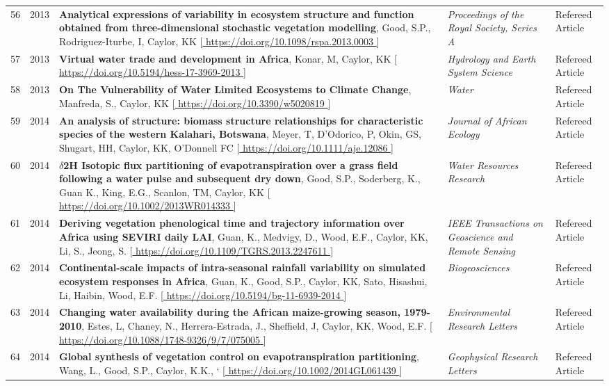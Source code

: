 \begin{supertabular}{lcp{8.25cm}p{4.75cm}p{1.75cm}}
56 & 2013 & {\bf Analytical expressions of variability in ecosystem structure and function obtained from three-dimensional stochastic vegetation modelling}, Good, S.P., Rodriguez-Iturbe, I, Caylor, KK [\url{ https://doi.org/10.1098/rspa.2013.0003 }] & \emph{ Proceedings of the Royal Society, Series A } & Refereed Article\\
57 & 2013 & {\bf Virtual water trade and development in Africa}, Konar, M, Caylor, KK [\url{ https://doi.org/10.5194/hess-17-3969-2013 }] & \emph{ Hydrology and Earth System Science } & Refereed Article\\
58 & 2013 & {\bf On The Vulnerability of Water Limited Ecosystems to Climate Change}, Manfreda, S., Caylor, KK [\url{ https://doi.org/10.3390/w5020819 }] & \emph{ Water } & Refereed Article\\
59 & 2014 & {\bf An analysis of structure: biomass structure relationships for characteristic species of the western Kalahari, Botswana}, Meyer, T, D'Odorico, P, Okin, GS, Shugart, HH, Caylor, KK, O'Donnell FC [\url{ https://doi.org/10.1111/aje.12086 }] & \emph{ Journal of African Ecology } & Refereed Article\\
60 & 2014 & {\bf $\delta$2H Isotopic flux partitioning of evapotranspiration over a grass field following a water pulse and subsequent dry down}, Good, S.P., Soderberg, K., Guan K., King, E.G., Scanlon, TM, Caylor, KK [\url{ https://doi.org/10.1002/2013WR014333 }] & \emph{ Water Resources Research } & Refereed Article\\
61 & 2014 & {\bf Deriving vegetation phenological time and trajectory information over Africa using SEVIRI daily LAI}, Guan, K., Medvigy, D., Wood, E.F., Caylor, KK, Li, S., Jeong, S. [\url{ https://doi.org/10.1109/TGRS.2013.2247611 }] & \emph{ IEEE Transactions on Geoscience and Remote Sensing } & Refereed Article\\
62 & 2014 & {\bf Continental-scale impacts of intra-seasonal rainfall variability on simulated ecosystem responses in Africa}, Guan, K., Good, S.P., Caylor, KK, Sato, Hisashui, Li, Haibin, Wood, E.F. [\url{ https://doi.org/10.5194/bg-11-6939-2014 }] & \emph{ Biogeosciences } & Refereed Article\\
63 & 2014 & {\bf Changing water availability during the African maize-growing season, 1979-2010}, Estes, L, Chaney, N., Herrera-Estrada, J., Sheffield, J, Caylor, KK, Wood, E.F. [\url{ https://doi.org/10.1088/1748-9326/9/7/075005 }] & \emph{ Environmental Research Letters } & Refereed Article\\
64 & 2014 & {\bf Global synthesis of vegetation control on evapotranspiration partitioning}, Wang, L., Good, S.P., Caylor, K.K., ` [\url{ https://doi.org/10.1002/2014GL061439 }] & \emph{ Geophysical Research Letters } & Refereed Article\\

\end{supertabular}
